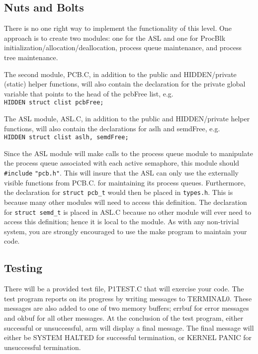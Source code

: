 \subsection{Nuts and Bolts}
There is no one right way to implement the functionality of this level. 
One approach is to create two modules: one for the ASL and one for ProcBlk initialization/allocation/deallocation, process queue maintenance, and process tree maintenance.

The second module, PCB.C, in addition to the public and HIDDEN/private (static) helper functions, will also contain the declaration for the private global variable that points to the head of the pcbFree list, e.g.\\
\verb+HIDDEN struct clist pcbFree;+

The ASL module, ASL.C, in addition to the public and HIDDEN/private helper functions, will also contain the declarations for aslh and semdFree, e.g.\\
\verb+HIDDEN struct clist aslh, semdFree;+

Since the ASL module will make calls to the process queue module to manipulate the process queue associated with each active semaphore, this module should \verb+#include+ \verb+"pcb.h"+.
This will insure that the ASL can only use the externally visible functions from PCB.C. for maintaining its process queues.
Furthermore, the declaration for \verb+struct pcb_t+ would then be placed in \verb+types.h+.
This is because many other modules will need to access this definition. 
The declaration for \verb+struct semd_t+ is placed in ASL.C because no other module will ever need to access this definition; hence it is local to the module. 
As with any non-trivial system, you are strongly encouraged to use the make program to maintain your code.

\subsection{Testing}
There will be a provided test file, P1TEST.C that will exercise your code.
The test program reports on its progress by writing messages to TERMINAL0.
These messages are also added to one of two memory buffers; errbuf for error messages and okbuf for all other messages. 
At the conclusion of the test program, either successful or unsuccessful, arm will display a final message. 
The final message will either be SYSTEM HALTED for successful termination, or KERNEL PANIC for unsuccessful termination.


